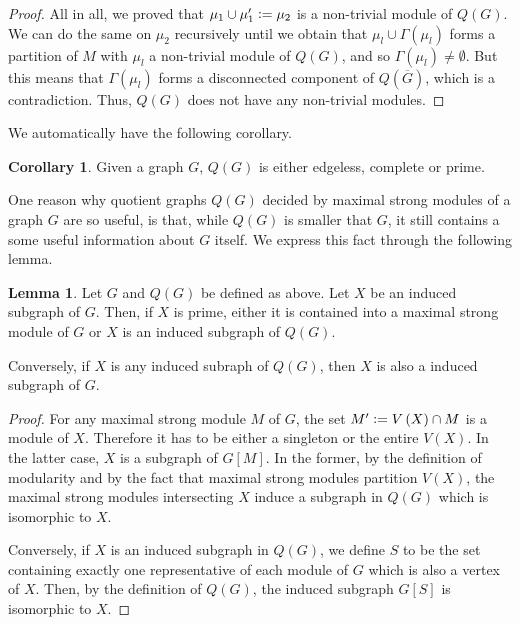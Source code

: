 \documentclass{article}
\theoremstyle{definition}
\newtheorem{lemma}[thm]{Lemma}
\newtheorem{cor}[thm]{Corollary}
\newcommand{\defeq}{\vcentcolon=}
\begin{document}
\begin{proof}
        All in all, we proved that $\mu_1 \cup \mu_1' \defeq \mu_2$
        is a non-trivial module of $Q\left(G\right)$. 
        We can do the same on $\mu_2$ recursively until we obtain that
        $\mu_{l} \cup \Gamma\left(\mu_{l}\right)$ forms a partition of $M$ 
        with $\mu_{l}$ a non-trivial module of $Q\left(G\right)$, 
        and so $\Gamma\left(\mu_{l}\right) \neq \emptyset$.
        But this means that $\Gamma\left(\mu_{l}\right)$ forms
        a disconnected component of $Q\left(\overline{G}\right)$, which is a contradiction.
        Thus, $Q\left(G\right)$ does not have any non-trivial modules.
    \end{proof}
    
    We automatically have the following corollary.

    \begin{cor}
        Given a graph $G$, $Q\left(G\right)$
        is either edgeless, complete or prime.
    \end{cor}   
    
    One reason why
    quotient graphs $Q\left(G\right)$
    decided by maximal strong
    modules of a graph $G$ 
    are so useful, is
    that, while $Q\left(G\right)$
    is smaller that $G$, 
    it still contains a some
    useful information about
    $G$ itself. We express
    this fact through the following lemma.

    \begin{lemma} \label{prime lemma}
        Let $G$ and $Q\left(G\right)$
        be defined as above.
        Let $X$ be an
        induced subgraph
        of $G$. Then,
        if $X$ is prime, either
        it is contained into 
        a maximal strong module
        of $G$ or $X$ is 
        an induced subgraph of $Q\left(G\right)$.

        Conversely, if $X$ is any induced subraph of $Q\left(G\right)$,
        then $X$ is also a induced subgraph of $G$.
    \end{lemma}
    \begin{proof}
        For any maximal strong module $M$ of
        $G$, the set $M' \defeq V\left(X\right) \cap M$
        is a module of $X$. Therefore
        it has to be either a singleton or
        the entire $V\left(X\right)$.
        In the latter case, $X$ is a subgraph
        of $G\left[M\right]$.
        In the former,
        by the definition
        of modularity
        and by the fact
        that maximal strong
        modules partition
        $V\left(X\right)$,
        the maximal strong modules
        intersecting $X$ induce a subgraph
        in $Q\left(G\right)$ which is
        isomorphic to $X$.

        Conversely, if $X$ is 
        an induced subgraph
        in $Q\left(G\right)$,
        we define 
        $S$ to be the
        set containing exactly
        one representative of each
        module of $G$ which is
        also a vertex of $X$.
        Then, by the definition
        of $Q\left(G\right)$,
        the induced
        subgraph $G\left[S\right]$ 
        is isomorphic to $X$.
    \end{proof}
\end{document}
